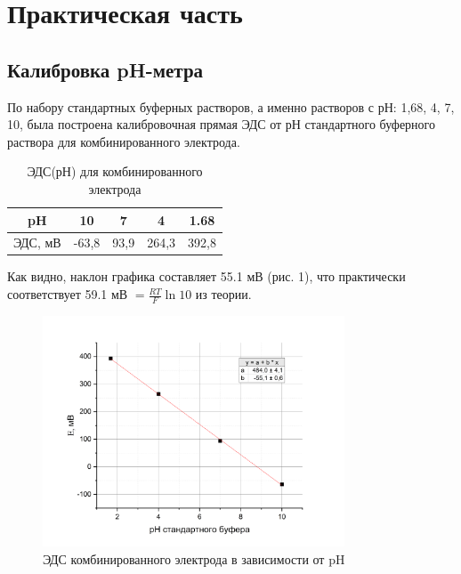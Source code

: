 \documentclass[a4paper, 12pt]{article}
\begin{document}
\newpage
\section{Практическая часть}
\subsection{Калибровка pH-метра}
По набору стандартных буферных растворов, а именно растворов с рН: 1,68, 4, 7, 10, была построена калибровочная прямая ЭДС от рН стандартного буферного раствора для комбинированного электрода.
\begin{table}[h]
\begin{center}
\caption{ЭДС(рН) для комбинированного электрода}
\begin{tabular}{|c|c|c|c|c|}
\hline
pH      & 10  & 7    & 4     & 1.68  \\ \hline
ЭДС, мВ & -63,8     & 93,9 & 264,3 & 392,8 \\ \hline
\end{tabular}
\end{center}
\end{table}

Как видно, наклон графика составляет 55.1 мВ (рис. 1), что практически соответствует 59.1 мВ $=\frac{R T}{F} \ln 10$ из теории.

\begin{figure}[h!]
    \begin{center}
    \includegraphics[width=0.8\textwidth]{1.1.png}
    \end{center}
    \caption{ЭДС комбинированного электрода в зависимости от pH}
\end{figure}


\end{document}
